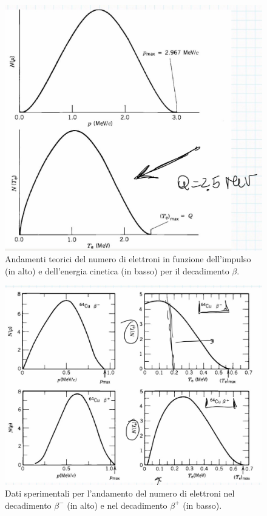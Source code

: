 \begin{figure}[h]
    \centering
    \includegraphics[scale=0.2]{Immagini/0304_andamenti.png}
    \caption{Andamenti teorici del numero di elettroni in funzione dell'impulso (in alto) e dell'energia cinetica (in basso) per il decadimento $\beta$.}
    \label{0304_teo}
\end{figure}
\begin{figure}[h]
    \centering
    \includegraphics[scale=0.2]{Immagini/0304_andamenti2.png}
    \caption{Dati sperimentali per l'andamento del numero di elettroni nel decadimento $\beta^-$ (in alto) e nel decadimento $\beta^+$ (in basso).}
    \label{0304_dati}
\end{figure}

